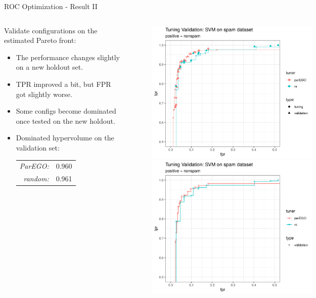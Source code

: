 \documentclass[11pt,compress,t,notes=noshow,xcolor=table]{beamer}
\begin{document}
\begin{vbframe}{ROC Optimization - Result II}

\begin{columns}
\begin{column}{0.42\textwidth}
Validate configurations on the estimated Pareto front:
\begin{itemize}
  \item The performance changes slightly on a new holdout set.
  \item TPR improved a bit, but FPR got slightly worse.
  \item Some configs become dominated once tested on the new holdout.
  \item Dominated hypervolume on the validation set:
  \begin{tabular}{rl}
    \emph{ParEGO:} & 0.960\\
    \emph{random:} & 0.961
  \end{tabular}
\end{itemize}
\end{column}
\begin{column}{0.65\textwidth}
\vspace{-0.2cm}
\begin{figure}
\includegraphics[width=0.6\textwidth]{slides/11-multicrit/figure_man/example_parego_spam_outer.png}\\
\includegraphics[width=0.6\textwidth]{slides/11-multicrit/figure_man/example_parego_spam_outer_pareto.png}
\end{figure}
\end{column}
\end{columns}

\end{vbframe}
\end{document}
